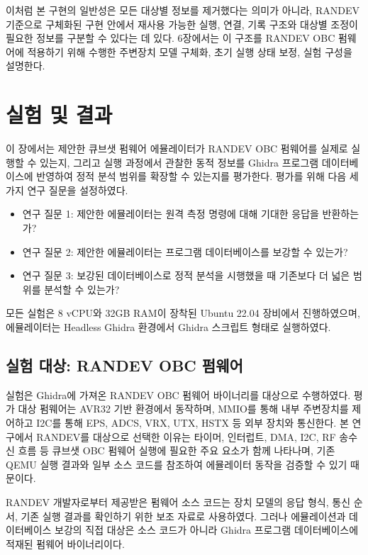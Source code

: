 \documentclass[master,korean,final]{kaist-ucs}
\begin{document}
이처럼 본 구현의 일반성은 모든 대상별 정보를 제거했다는 의미가 아니라, RANDEV 기준으로 구체화된 구현 안에서 재사용 가능한 실행, 연결, 기록 구조와 대상별 조정이 필요한 정보를 구분할 수 있다는 데 있다. 6장에서는 이 구조를 RANDEV OBC 펌웨어에 적용하기 위해 수행한 주변장치 모델 구체화, 초기 실행 상태 보정, 실험 구성을 설명한다.

\chapter{실험 및 결과}

이 장에서는 제안한 큐브샛 펌웨어 에뮬레이터가 RANDEV OBC 펌웨어를 실제로 실행할 수 있는지, 그리고 실행 과정에서 관찰한 동적 정보를 Ghidra 프로그램 데이터베이스에 반영하여 정적 분석 범위를 확장할 수 있는지를 평가한다. 평가를 위해 다음 세 가지 연구 질문을 설정하였다.

\begin{itemize}
    \item 연구 질문 1: 제안한 에뮬레이터는 원격 측정 명령에 대해 기대한 응답을 반환하는가?
    \item 연구 질문 2: 제안한 에뮬레이터는 프로그램 데이터베이스를 보강할 수 있는가?
    \item 연구 질문 3: 보강된 데이터베이스로 정적 분석을 시행했을 때 기존보다 더 넓은 범위를 분석할 수 있는가?
\end{itemize}

모든 실험은 8 vCPU와 32GB RAM이 장착된 Ubuntu 22.04 장비에서 진행하였으며, 에뮬레이터는 Headless Ghidra 환경에서 Ghidra 스크립트 형태로 실행하였다.

\section{실험 대상: RANDEV OBC 펌웨어}

실험은 Ghidra에 가져온 RANDEV OBC 펌웨어 바이너리를 대상으로 수행하였다. 평가 대상 펌웨어는 AVR32 기반 환경에서 동작하며, MMIO를 통해 내부 주변장치를 제어하고 I2C를 통해 EPS, ADCS, VRX, UTX, HSTX 등 외부 장치와 통신한다. 본 연구에서 RANDEV를 대상으로 선택한 이유는 타이머, 인터럽트, DMA, I2C, RF 송수신 흐름 등 큐브샛 OBC 펌웨어 실행에 필요한 주요 요소가 함께 나타나며, 기존 QEMU 실행 결과와 일부 소스 코드를 참조하여 에뮬레이터 동작을 검증할 수 있기 때문이다.

RANDEV 개발자로부터 제공받은 펌웨어 소스 코드는 장치 모델의 응답 형식, 통신 순서, 기존 실행 결과를 확인하기 위한 보조 자료로 사용하였다. 그러나 에뮬레이션과 데이터베이스 보강의 직접 대상은 소스 코드가 아니라 Ghidra 프로그램 데이터베이스에 적재된 펌웨어 바이너리이다.
\end{document}
